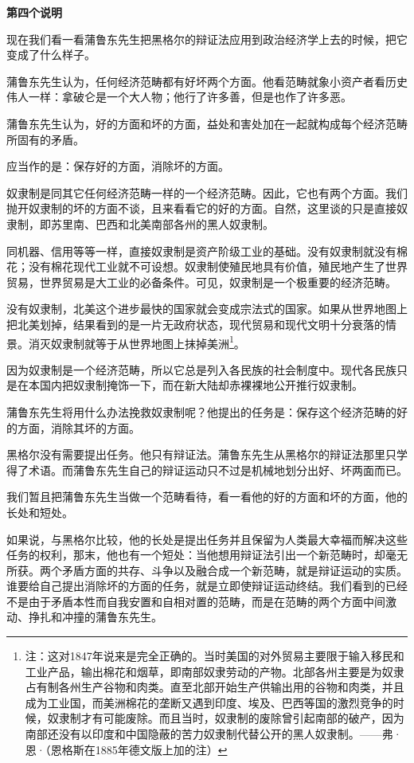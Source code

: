 \documentclass[a4paper,twoside,12pt,AutoFakeBold]{ctexart}
\begin{document}
\begin{center}
    \textbf{第四个说明}
\end{center}

现在我们看一看蒲鲁东先生把黑格尔的辩证法应用到政治经济学上去的时候，把它变成了什么样子。

蒲鲁东先生认为，任何经济范畴都有好坏两个方面。他看范畴就象小资产者看历史伟人一样：拿破仑是一个大人物；他行了许多善，但是也作了许多恶。

蒲鲁东先生认为，好的方面和坏的方面，益处和害处加在一起就构成每个经济范畴所固有的矛盾。

应当作的是：保存好的方面，消除坏的方面。

奴隶制是同其它任何经济范畴一样的一个经济范畴。因此，它也有两个方面。我们抛开奴隶制的坏的方面不谈，且来看看它的好的方面。自然，这里谈的只是直接奴隶制，即苏里南、巴西和北美南部各州的黑人奴隶制。

同机器、信用等等一样，直接奴隶制是资产阶级工业的基础。没有奴隶制就没有棉花；没有棉花现代工业就不可设想。奴隶制使殖民地具有价值，殖民地产生了世界贸易，世界贸易是大工业的必备条件。可见，奴隶制是一个极重要的经济范畴。

没有奴隶制，北美这个进步最快的国家就会变成宗法式的国家。如果从世界地图上把北美划掉，结果看到的是一片无政府状态，现代贸易和现代文明十分衰落的情景。消灭奴隶制就等于从世界地图上抹掉美洲\footnote{注：这对1847年说来是完全正确的。当时美国的对外贸易主要限于输入移民和工业产品，输出棉花和烟草，即南部奴隶劳动的产物。北部各州主要是为奴隶占有制各州生产谷物和肉类。直至北部开始生产供输出用的谷物和肉类，并且成为工业国，而美洲棉花的垄断又遇到印度、埃及、巴西等国的激烈竞争的时候，奴隶制才有可能废除。而且当时，奴隶制的废除曾引起南部的破产，因为南部还没有以印度和中国隐蔽的苦力奴隶制代替公开的黑人奴隶制。——弗·恩·（恩格斯在1885年德文版上加的注）}。

因为奴隶制是一个经济范畴，所以它总是列入各民族的社会制度中。现代各民族只是在本国内把奴隶制掩饰一下，而在新大陆却赤裸裸地公开推行奴隶制。

蒲鲁东先生将用什么办法挽救奴隶制呢？他提出的任务是：保存这个经济范畴的好的方面，消除其坏的方面。

黑格尔没有需要提出任务。他只有辩证法。蒲鲁东先生从黑格尔的辩证法那里只学得了术语。而蒲鲁东先生自己的辩证运动只不过是机械地划分出好、坏两面而已。

我们暂且把蒲鲁东先生当做一个范畴看待，看一看他的好的方面和坏的方面，他的长处和短处。

如果说，与黑格尔比较，他的长处是提出任务并且保留为人类最大幸福而解决这些任务的权利，那末，他也有一个短处：当他想用辩证法引出一个新范畴时，却毫无所获。两个矛盾方面的共存、斗争以及融合成一个新范畴，就是辩证运动的实质。谁要给自己提出消除坏的方面的任务，就是立即使辩证运动终结。我们看到的已经不是由于矛盾本性而自我安置和自相对置的范畴，而是在范畴的两个方面中间激动、挣扎和冲撞的蒲鲁东先生。
\end{document}

